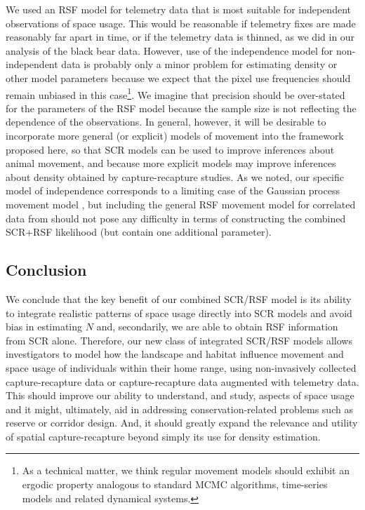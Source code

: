 \documentclass[12pt]{article}
\begin{document}
We used an RSF model for telemetry data that is most suitable for
independent observations of space usage.  This would be reasonable if
telemetry fixes are made reasonably far apart in time, or if the
telemetry data %
is thinned, as we did in our analysis of the
black bear data.  However, use of the independence model for
non-independent data is probably only a minor problem for estimating
density or other model parameters because we expect that the pixel use
frequencies should remain unbiased in this case\footnote{As a
  technical matter, we think regular movement models should exhibit an
  ergodic property analogous to standard MCMC algorithms, time-series
  models and related dynamical systems.}.  We imagine that precision
should be over-stated for the parameters of the RSF model because the
sample size is not reflecting the dependence of the observations.  In
general, however, it will be desirable to incorporate more general (or
explicit) models of movement into the framework proposed here, so that
SCR models can be used to improve inferences about animal movement,
and because more explicit models may improve inferences about density
obtained by capture-recapture studies.  As we noted, our specific model
of independence corresponds to a limiting case of the Gaussian process
movement model \citep{johnson_etal:2008}, but including the general
RSF movement model for correlated data from \citet{johnson_etal:2008}
should not pose any difficulty in terms of constructing the combined
SCR+RSF likelihood (but contain one additional parameter).



\subsection{Conclusion}

We conclude that the key benefit of our combined SCR/RSF model is its
ability to integrate realistic patterns of space usage directly into SCR
models and avoid 
bias in estimating $N$ and, secondarily, we
are able to obtain RSF information from SCR alone.  Therefore, our new
class of integrated SCR/RSF models allows investigators to model how
the landscape and habitat influence movement and space usage of
individuals within their home range, using non-invasively collected
capture-recapture data or capture-recapture data augmented with
telemetry data.  This should improve our ability to understand, and
study, aspects of space usage and it might, ultimately, aid in
addressing conservation-related problems such as reserve or corridor
design. And, it should greatly expand the relevance and utility of
spatial capture-recapture beyond simply its use for density
estimation.
\end{document}
